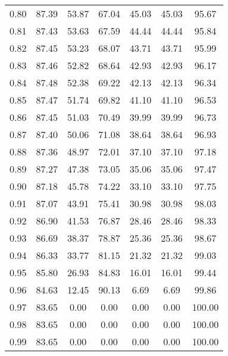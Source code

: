 \begin{tabular}{|c|c|c|c|c|c|c|}
      0.80 &     87.39 &     53.87 &      67.04 &   45.03 &      45.03 &         95.67 \\
      0.81 &     87.43 &     53.63 &      67.59 &   44.44 &      44.44 &         95.84 \\
      0.82 &     87.45 &     53.23 &      68.07 &   43.71 &      43.71 &         95.99 \\
      0.83 &     87.46 &     52.82 &      68.64 &   42.93 &      42.93 &         96.17 \\
      0.84 &     87.48 &     52.38 &      69.22 &   42.13 &      42.13 &         96.34 \\
      0.85 &     87.47 &     51.74 &      69.82 &   41.10 &      41.10 &         96.53 \\
      0.86 &     87.45 &     51.03 &      70.49 &   39.99 &      39.99 &         96.73 \\
      0.87 &     87.40 &     50.06 &      71.08 &   38.64 &      38.64 &         96.93 \\
      0.88 &     87.36 &     48.97 &      72.01 &   37.10 &      37.10 &         97.18 \\
      0.89 &     87.27 &     47.38 &      73.05 &   35.06 &      35.06 &         97.47 \\
      0.90 &     87.18 &     45.78 &      74.22 &   33.10 &      33.10 &         97.75 \\
      0.91 &     87.07 &     43.91 &      75.41 &   30.98 &      30.98 &         98.03 \\
      0.92 &     86.90 &     41.53 &      76.87 &   28.46 &      28.46 &         98.33 \\
      0.93 &     86.69 &     38.37 &      78.87 &   25.36 &      25.36 &         98.67 \\
      0.94 &     86.33 &     33.77 &      81.15 &   21.32 &      21.32 &         99.03 \\
      0.95 &     85.80 &     26.93 &      84.83 &   16.01 &      16.01 &         99.44 \\
      0.96 &     84.63 &     12.45 &      90.13 &    6.69 &       6.69 &         99.86 \\
      0.97 &     83.65 &      0.00 &       0.00 &    0.00 &       0.00 &        100.00 \\
      0.98 &     83.65 &      0.00 &       0.00 &    0.00 &       0.00 &        100.00 \\
      0.99 &     83.65 &      0.00 &       0.00 &    0.00 &       0.00 &        100.00 \\
\bottomrule
\end{tabular}
